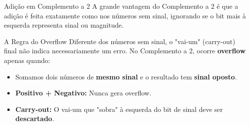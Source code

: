 \begin{frame}{Adição em Complemento a 2}
    A grande vantagem do Complemento a 2 é que a adição é feita exatamente como nos números sem sinal, ignorando se o bit mais à esquerda representa sinal ou magnitude.

    \begin{block}{A Regra do Overflow}
        Diferente dos números sem sinal, o "vai-um" (carry-out) final não indica necessariamente um erro. No Complemento a 2, ocorre \textbf{overflow} apenas quando:
        \begin{itemize}
            \item Somamos dois números de \textbf{mesmo sinal} e o resultado tem \textbf{sinal oposto}.
        \end{itemize}
    \end{block}

    \begin{itemize}
        \item \textbf{Positivo + Negativo:} Nunca gera overflow.
        \item \textbf{Carry-out:} O vai-um que "sobra" à esquerda do bit de sinal deve ser \textbf{descartado}.
    \end{itemize}
\end{frame}


